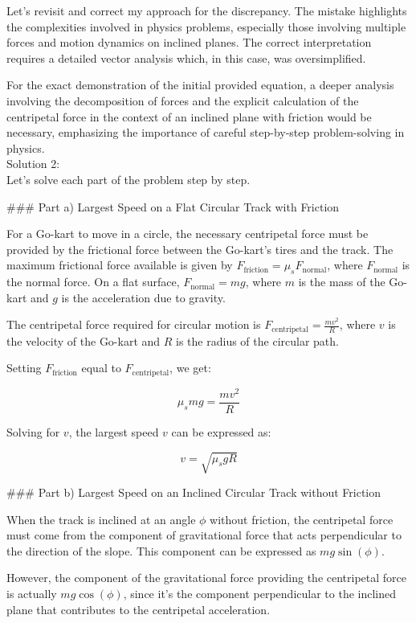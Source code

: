 \documentclass[a4paper,11pt]{article}
\begin{document}
Let's revisit and correct my approach for the discrepancy. The mistake highlights the complexities involved in physics problems, especially those involving multiple forces and motion dynamics on inclined planes. The correct interpretation requires a detailed vector analysis which, in this case, was oversimplified. 

For the exact demonstration of the initial provided equation, a deeper analysis involving the decomposition of forces and the explicit calculation of the centripetal force in the context of an inclined plane with friction would be necessary, emphasizing the importance of careful step-by-step problem-solving in physics. \\

\noindent Solution 2: \\

Let's solve each part of the problem step by step.

### Part a) Largest Speed on a Flat Circular Track with Friction

For a Go-kart to move in a circle, the necessary centripetal force must be provided by the frictional force between the Go-kart's tires and the track. The maximum frictional force available is given by \( F_{\text{friction}} = \mu_{s} F_{\text{normal}} \), where \( F_{\text{normal}} \) is the normal force. On a flat surface, \( F_{\text{normal}} = mg \), where \( m \) is the mass of the Go-kart and \( g \) is the acceleration due to gravity.

The centripetal force required for circular motion is \( F_{\text{centripetal}} = \frac{mv^2}{R} \), where \( v \) is the velocity of the Go-kart and \( R \) is the radius of the circular path.

Setting \( F_{\text{friction}} \) equal to \( F_{\text{centripetal}} \), we get:

\[
\mu_{s} mg = \frac{mv^2}{R}
\]

Solving for \( v \), the largest speed \( v \) can be expressed as:

\[
v = \sqrt{\mu_{s} g R}
\]

### Part b) Largest Speed on an Inclined Circular Track without Friction

When the track is inclined at an angle \( \phi \) without friction, the centripetal force must come from the component of gravitational force that acts perpendicular to the direction of the slope. This component can be expressed as \( mg\sin(\phi) \).

However, the component of the gravitational force providing the centripetal force is actually \( mg\cos(\phi) \), since it's the component perpendicular to the inclined plane that contributes to the centripetal acceleration.
\end{document}
